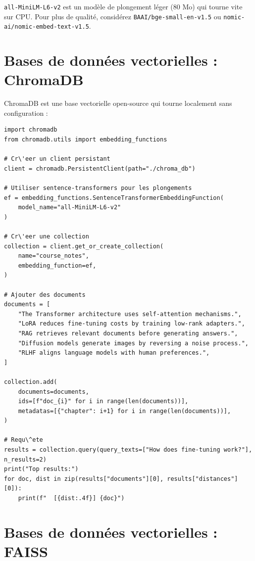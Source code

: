 \begin{aitip}
\texttt{all-MiniLM-L6-v2} est un mod\`ele de plongement l\'eger (80 Mo) qui tourne vite sur CPU. Pour plus de qualit\'e, consid\'erez \texttt{BAAI/bge-small-en-v1.5} ou \texttt{nomic-ai/nomic-embed-text-v1.5}.
\end{aitip}

\section{Bases de donn\'ees vectorielles : ChromaDB}

ChromaDB est une base vectorielle open-source qui tourne localement sans configuration :

\begin{verbatim}
import chromadb
from chromadb.utils import embedding_functions

# Cr\'eer un client persistant
client = chromadb.PersistentClient(path="./chroma_db")

# Utiliser sentence-transformers pour les plongements
ef = embedding_functions.SentenceTransformerEmbeddingFunction(
    model_name="all-MiniLM-L6-v2"
)

# Cr\'eer une collection
collection = client.get_or_create_collection(
    name="course_notes",
    embedding_function=ef,
)

# Ajouter des documents
documents = [
    "The Transformer architecture uses self-attention mechanisms.",
    "LoRA reduces fine-tuning costs by training low-rank adapters.",
    "RAG retrieves relevant documents before generating answers.",
    "Diffusion models generate images by reversing a noise process.",
    "RLHF aligns language models with human preferences.",
]

collection.add(
    documents=documents,
    ids=[f"doc_{i}" for i in range(len(documents))],
    metadatas=[{"chapter": i+1} for i in range(len(documents))],
)

# Requ\^ete
results = collection.query(query_texts=["How does fine-tuning work?"], n_results=2)
print("Top results:")
for doc, dist in zip(results["documents"][0], results["distances"][0]):
    print(f"  [{dist:.4f}] {doc}")
\end{verbatim}

\section{Bases de donn\'ees vectorielles : FAISS}

